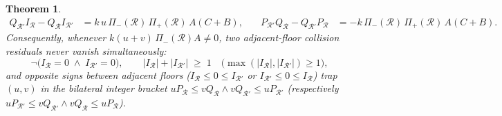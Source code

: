 \documentclass[11pt,a4paper]{article}
\theoremstyle{plain}
\newtheorem{theorem}{Theorem}[section]
\theoremstyle{definition}
\begin{document}
\begin{theorem}
\begin{equation}
\begin{aligned}
    Q_{\mathcal{R}'}I_{\mathcal{R}} - Q_{\mathcal{R}}I_{\mathcal{R}'} &= k\,u\,\Pi_-(\mathcal{R})\,\Pi_+(\mathcal{R})\,A(C+B), &\quad
    P_{\mathcal{R}'}Q_{\mathcal{R}} - Q_{\mathcal{R}'}P_{\mathcal{R}} &= -k\,\Pi_-(\mathcal{R})\,\Pi_+(\mathcal{R})\,A(C+B).
  \end{aligned}
\end{equation}
Consequently, whenever $k(u+v)\,\Pi_-(\mathcal{R})A \ne 0$, two adjacent-floor collision residuals never vanish simultaneously:
\[
  \neg\bigl(I_{\mathcal{R}} = 0 \;\land\; I_{\mathcal{R}'} = 0\bigr), \qquad
  |I_{\mathcal{R}}| + |I_{\mathcal{R}'}| \;\ge\; 1 \quad\bigl(\max(|I_{\mathcal{R}}|,|I_{\mathcal{R}'}|) \ge 1\bigr),
\]
and opposite signs between adjacent floors ($I_{\mathcal{R}} \le 0 \le I_{\mathcal{R}'}$ or $I_{\mathcal{R}'} \le 0 \le I_{\mathcal{R}}$) trap $(u,v)$ in the bilateral integer bracket $u P_{\mathcal{R}} \le v Q_{\mathcal{R}} \land v Q_{\mathcal{R}'} \le u P_{\mathcal{R}'}$ (respectively $u P_{\mathcal{R}'} \le v Q_{\mathcal{R}'} \land v Q_{\mathcal{R}} \le u P_{\mathcal{R}}$).
\end{theorem}
\end{document}
